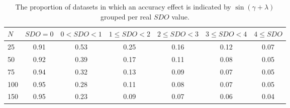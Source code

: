 \documentclass[]{interact}
\begin{document}
\begin{table}[ht]
\centering
\caption{The proportion of datasets in which an accuracy effect is indicated by $\sin(\gamma+ \lambda)$ grouped per real $SDO$ value.} 
\begin{tabular}{lcccccc}
  \noalign{\smallskip}\hline\noalign{\smallskip}
$N$ & $SDO = 0$ & $ 0 < SDO < 1$ & $1 \leq SDO < 2$ & $2 \leq SDO < 3$ &  $3 \leq SDO < 4$ & $4 \leq SDO$\\ \hline\noalign{\smallskip}
25 & 0.91 & 0.53 & 0.25 & 0.16 & 0.12 & 0.07 \\
50 & 0.92 & 0.39 & 0.17 & 0.11 & 0.08 & 0.05 \\
75 & 0.94 & 0.32 & 0.13 & 0.09 & 0.07 & 0.05 \\
100& 0.95 & 0.28 & 0.11 & 0.08 & 0.07 & 0.05 \\
150& 0.95 & 0.23 & 0.09 & 0.07 & 0.06 & 0.04 \\
   \hline
\end{tabular}
\label{TableResdetminmax}
\end{table}
\end{document}
